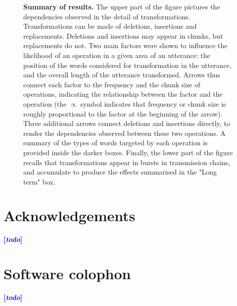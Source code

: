 \documentclass[a4paper,fleqn]{cas-dc}
\newcommand{\tb}[1]{\textcolor{blue}{#1}}
\newcommand{\rk}[1]{\tb{{\footnotesize {\bf[\emph{#1}]}}}}
\begin{document}
\begin{figure}
  \caption[Summary of results]{
  \textbf{Summary of results.}
  The upper part of the figure pictures the dependencies observed in the detail of transformations.
  Transformations can be made of deletions, insertions and replacements.
  Deletions and insertions may appear in chunks, but replacements do not.
  Two main factors were shown to influence the likelihood of an operation in a given area of an utterance:
  the position of the words considered for transformation in the utterance, and the overall length of the utterance transformed.
  Arrows thus connect each factor to the frequency and the chunk size of operations, indicating the relationship between the factor and the operation (the $\propto$ symbol indicates that frequency or chunk size is roughly proportional to the factor at the beginning of the arrow).
  Three additional arrows connect deletions and insertions directly, to render the dependencies observed between these two operations.
  A summary of the types of words targeted by each operation is provided inside the darker boxes.
  Finally, the lower part of the figure recalls that transformations appear in bursts in transmission chains, and accumulate to produce the effects summarised in the "Long term" box.
  }
  \label{fig:gistr-summary}
\end{figure}






\printcredits

\section*{Acknowledgements}
\rk{todo}

\section*{Software colophon}
\rk{todo}




\end{document}
